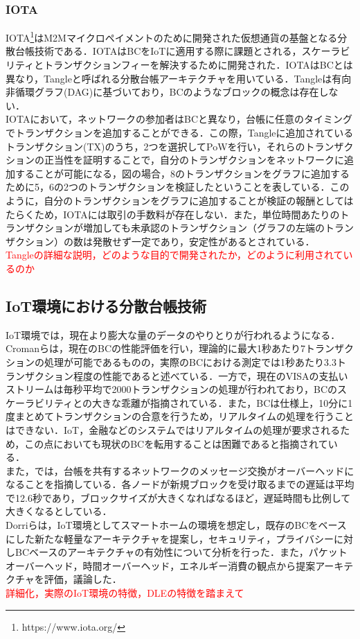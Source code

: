 \documentclass{kuisthesis}			%
\begin{document}
\subsubsection{IOTA}
IOTA\footnote{https://www.iota.org/}はM2Mマイクロペイメントのために開発された仮想通貨の基盤となる分散台帳技術である．IOTAはBCをIoTに適用する際に課題とされる，スケーラビリティとトランザクションフィーを解決するために開発された．IOTAはBCとは異なり，Tangleと呼ばれる分散台帳アーキテクチャを用いている．Tangleは有向非循環グラフ(DAG)に基づいており，BCのようなブロックの概念は存在しない．\\
IOTAにおいて，ネットワークの参加者はBCと異なり，台帳に任意のタイミングでトランザクションを追加することができる．この際，Tangleに追加されているトランザクション(TX)のうち，2つを選択してPoWを行い，それらのトランザクションの正当性を証明することで，自分のトランザクションをネットワークに追加することが可能になる，図の場合，8のトランザクションをグラフに追加するために5，6の2つのトランザクションを検証したということを表している．このように，自分のトランザクションをグラフに追加することが検証の報酬としてはたらくため，IOTAには取引の手数料が存在しない．また，単位時間あたりのトランザクションが増加しても未承認のトランザクション（グラフの左端のトランザクション）の数は発散せず一定であり，安定性があるとされている\cite{kusmierz2017first}．\\
\textcolor{red}{Tangleの詳細な説明，どのような目的で開発されたか，どのように利用されているのか}\\

\subsection{IoT環境における分散台帳技術}
IoT環境では，現在より膨大な量のデータのやりとりが行われるようになる．Cromanらは，現在のBCの性能評価を行い，理論的に最大1秒あたり7トランザクションの処理が可能であるものの，実際のBCにおける測定では1秒あたり3.3トランザクション程度の性能であると述べている\cite{croman2016scaling}．一方で，現在のVISAの支払いストリームは毎秒平均で2000トランザクションの処理が行われており，BCのスケーラビリティとの大きな乖離が指摘されている．また，BCは仕様上，10分に1度まとめてトランザクションの合意を行うため，リアルタイムの処理を行うことはできない．IoT，金融などのシステムではリアルタイムの処理が要求されるため，この点においても現状のBCを転用することは困難であると指摘されている．\\
また，\cite{decker2013information}では，台帳を共有するネットワークのメッセージ交換がオーバーヘッドになることを指摘している．各ノードが新規ブロックを受け取るまでの遅延は平均で12.6秒であり，ブロックサイズが大きくなればなるほど，遅延時間も比例して大きくなるとしている．\\
Dorriらは，IoT環境としてスマートホームの環境を想定し，既存のBCをベースにした新たな軽量なアーキテクチャを提案し，セキュリティ，プライバシーに対しBCベースのアーキテクチャの有効性について分析を行った\cite{dorri2017blockchain}．また，パケットオーバーヘッド，時間オーバーヘッド，エネルギー消費の観点から提案アーキテクチャを評価，議論した．\\
\textcolor{red}{詳細化，実際のIoT環境の特徴，DLEの特徴を踏まえて}\\
\end{document}
